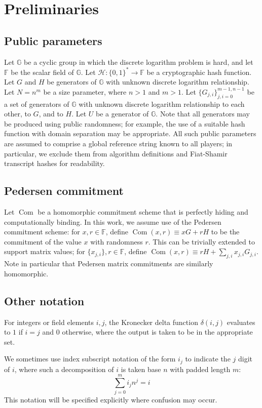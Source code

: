 \documentclass{article}
\newcommand{\G}{\mathbb{G}}
\newcommand{\F}{\mathbb{F}}
\newcommand{\com}{\operatorname{Com}}
\newcommand{\hs}{\mathcal{H}}
\theoremstyle{definition}
\begin{document}
\section{Preliminaries}
\subsection{Public parameters}
Let $\G$ be a cyclic group in which the discrete logarithm problem is hard, and let $\F$ be the scalar field of $\G$.
Let $\hs: \{0,1\}^* \to \F$ be a cryptographic hash function.
Let $G$ and $H$ be generators of $\G$ with unknown discrete logarithm relationship.
Let $N = n^m$ be a size parameter, where $n > 1$ and $m > 1$.
Let $\{G_{j,i}\}_{j,i=0}^{m-1,n-1}$ be a set of generators of $\G$ with unknown discrete logarithm relationship to each other, to $G$, and to $H$.
Let $U$ be a generator of $\G$.
Note that all generators may be produced using public randomness; for example, the use of a suitable hash function with domain separation may be appropriate.
All such public parameters are assumed to comprise a global reference string known to all players; in particular, we exclude them from algorithm definitions and Fiat-Shamir transcript hashes for readability.


\subsection{Pedersen commitment}
Let $\com$ be a homomorphic commitment scheme that is perfectly hiding and computationally binding.
In this work, we assume use of the Pedersen commitment scheme: for $x,r \in \F$, define $\com(x,r) \equiv xG + rH$ to be the commitment of the value $x$ with randomness $r$.
This can be trivially extended to support matrix values; for $\{x_{j,i}\},r \in \F$, define $\com(x,r) \equiv rH + \sum_{j,i} x_{j,i}G_{j,i}$.
Note in particular that Pedersen matrix commitments are similarly homomorphic.


\subsection{Other notation}
For integers or field elements $i,j$, the Kronecker delta function $\delta(i,j)$ evaluates to $1$ if $i=j$ and $0$ otherwise, where the output is taken to be in the appropriate set.

We sometimes use index subscript notation of the form $i_j$ to indicate the $j$ digit of $i$, where such a decomposition of $i$ is taken base $n$ with padded length $m$:
$$\sum_{j=0}^m i_j n^j = i$$
This notation will be specified explicitly where confusion may occur.
\end{document}
